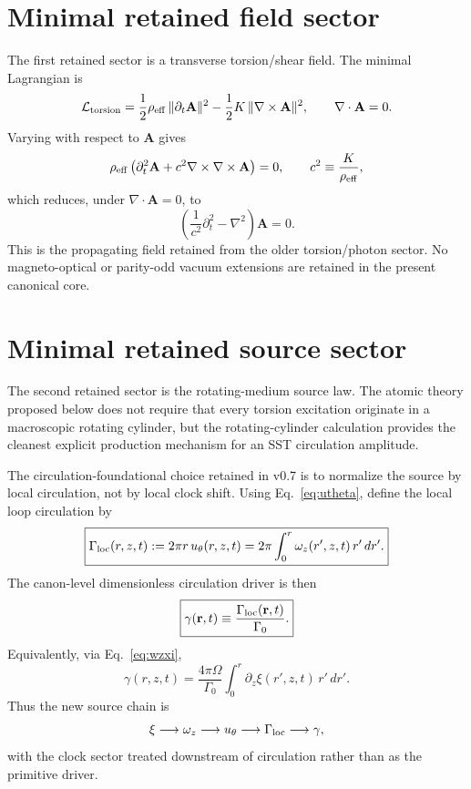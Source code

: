 \documentclass[11pt,a4paper]{article}
\begin{document}
\section{Minimal retained field sector}
The first retained sector is a transverse torsion/shear field. The minimal Lagrangian is
\begin{equation}
\label{eq:Ltorsion}
\mathcal{L}_{\rm torsion}
=
\frac12\rho_{\rm eff}\,\lVert \partial_t \mathbf{A}\rVert^2
-
\frac12 K\,\lVert \nabla\times\mathbf{A}\rVert^2,
\qquad
\nabla\cdot\mathbf{A}=0.
\end{equation}
Varying with respect to $\mathbf{A}$ gives
\begin{equation}
\label{eq:Awave-pre}
\rho_{\rm eff}\left(\partial_t^2\mathbf{A}+c^2\nabla\times\nabla\times\mathbf{A}\right)=0,
\qquad
c^2\equiv \frac{K}{\rho_{\rm eff}},
\end{equation}
which reduces, under $\nabla\cdot\mathbf{A}=0$, to
\begin{equation}
\label{eq:Awave}
\boxed{
\left(\frac{1}{c^2}\partial_t^2-\nabla^2\right)\mathbf{A}=0.
}
\end{equation}
This is the propagating field retained from the older torsion/photon sector. No magneto-optical or parity-odd vacuum extensions are retained in the present canonical core.

\section{Minimal retained source sector}
The second retained sector is the rotating-medium source law. The atomic theory proposed below does not require that every torsion excitation originate in a macroscopic rotating cylinder, but the rotating-cylinder calculation provides the cleanest explicit production mechanism for an SST circulation amplitude.

The circulation-foundational choice retained in v0.7 is to normalize the source by local circulation, not by local clock shift. Using Eq.~\eqref{eq:utheta}, define the local loop circulation by
\begin{equation}
\label{eq:GammaLoc}
\boxed{
\Gamma_{\rm loc}(r,z,t)
:=
2\pi r\,u_\theta(r,z,t)
=
2\pi\int_0^r \omega_z(r',z,t)\,r'\,dr'.
}
\end{equation}
The canon-level dimensionless circulation driver is then
\begin{equation}
\label{eq:gammaDef}
\boxed{
\gamma(\mathbf r,t)
\equiv
\frac{\Gamma_{\rm loc}(\mathbf r,t)}{\Gamma_0}.
}
\end{equation}
Equivalently, via Eq.~\eqref{eq:wzxi},
\begin{equation}
\label{eq:gammaXi}
\gamma(r,z,t)
=
\frac{4\pi\Omega}{\Gamma_0}
\int_0^r \partial_z \xi(r',z,t)\,r'\,dr'.
\end{equation}
Thus the new source chain is
\begin{equation}
\label{eq:source-chain}
\xi \longrightarrow \omega_z \longrightarrow u_\theta \longrightarrow \Gamma_{\rm loc} \longrightarrow \gamma,
\end{equation}
with the clock sector treated downstream of circulation rather than as the primitive driver.
\end{document}
